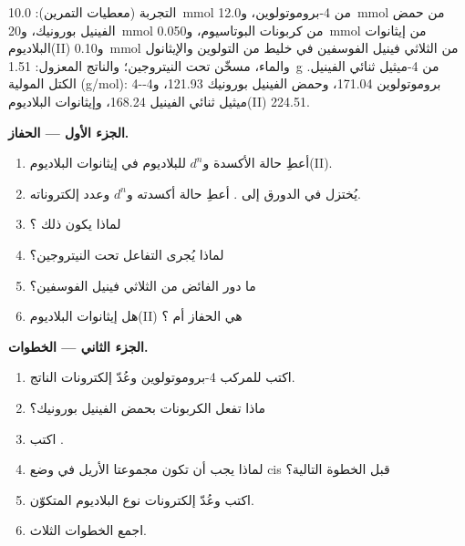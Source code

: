 \begin{problem}
\label{pb:b2:catalytic-cycles:1}
التجربة (معطيات التمرين): \qty{10.0}{mmol} من 4-بروموتولوين، و\qty{12.0}{mmol} من
حمض الفينيل بورونيك، و\qty{20}{mmol} من كربونات البوتاسيوم، و\qty{0.050}{mmol} من إيثانوات
البلاديوم(II) و\qty{0.10}{mmol} من الثلاثي فينيل الفوسفين في خليط من التولوين والإيثانول 
والماء، مسخّن تحت النيتروجين؛ والناتج المعزول: \qty{1.51}{g} من 4-ميثيل ثنائي الفينيل. الكتل
المولية (\unit{g/mol}): 4-بروموتولوين 171.04، وحمض الفينيل بورونيك 121.93، و4-ميثيل ثنائي الفينيل
168.24، وإيثانوات البلاديوم(II) 224.51.

\medskip
\noindent\textbf{الجزء الأول --- الحفاز.}
\begin{enumerate}
  \item أعطِ حالة الأكسدة و$d^n$ للبلاديوم في إيثانوات البلاديوم(II).
  \item يُختزل في الدورق إلى . أعطِ حالة أكسدته و$d^n$ 
        وعدد إلكتروناته.
  \item لماذا يكون ذلك ؟
  \item لماذا يُجرى التفاعل تحت النيتروجين؟
  \item ما دور الفائض من الثلاثي فينيل الفوسفين؟
  \item هل إيثانوات البلاديوم(II) هي الحفاز أم ؟
\end{enumerate}

\medskip
\noindent\textbf{الجزء الثاني --- الخطوات.}
\begin{enumerate}[resume]
  \item اكتب  للمركب 4-بروموتولوين وعُدّ إلكترونات الناتج.
  \item ماذا تفعل الكربونات بحمض الفينيل بورونيك؟
  \item اكتب .
  \item لماذا يجب أن تكون مجموعتا الأريل في وضع cis قبل الخطوة التالية؟
  \item اكتب  وعُدّ إلكترونات نوع البلاديوم المتكوّن.
  \item اجمع الخطوات الثلاث.
\end{enumerate}


\end{problem}
